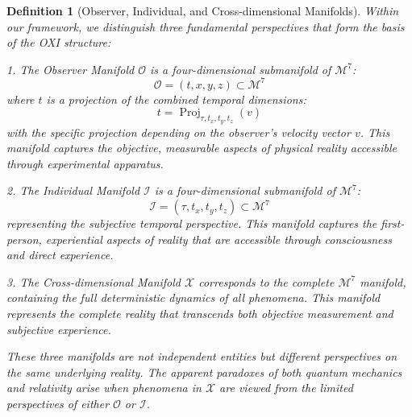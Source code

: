 \documentclass{article}
\newtheorem{definition}{Definition}
\DeclareMathOperator{\Proj}{Proj}
\begin{document}
\begin{definition}[Observer, Individual, and Cross-dimensional Manifolds]
Within our framework, we distinguish three fundamental perspectives that form the basis of the OXI structure:

1. The Observer Manifold $\mathcal{O}$ is a four-dimensional submanifold of $\mathcal{M}^7$:
\begin{equation}
\mathcal{O} = (t, x, y, z) \subset \mathcal{M}^7
\end{equation}
where $t$ is a projection of the combined temporal dimensions:
\begin{equation}
t = \Proj_{\tau, t_x, t_y, t_z}(v)
\end{equation}
with the specific projection depending on the observer's velocity vector $v$. This manifold captures the objective, measurable aspects of physical reality accessible through experimental apparatus.

2. The Individual Manifold $\mathcal{I}$ is a four-dimensional submanifold of $\mathcal{M}^7$:
\begin{equation}
\mathcal{I} = (\tau, t_x, t_y, t_z) \subset \mathcal{M}^7
\end{equation}
representing the subjective temporal perspective. This manifold captures the first-person, experiential aspects of reality that are accessible through consciousness and direct experience.

3. The Cross-dimensional Manifold $\mathcal{X}$ corresponds to the complete $\mathcal{M}^7$ manifold, containing the full deterministic dynamics of all phenomena. This manifold represents the complete reality that transcends both objective measurement and subjective experience.

These three manifolds are not independent entities but different perspectives on the same underlying reality. The apparent paradoxes of both quantum mechanics and relativity arise when phenomena in $\mathcal{X}$ are viewed from the limited perspectives of either $\mathcal{O}$ or $\mathcal{I}$.
\end{definition}
\end{document}
